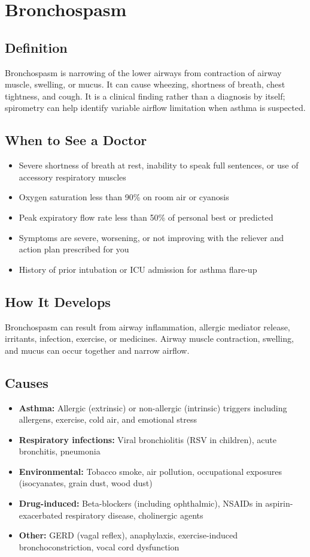 \chapter{Bronchospasm}

\section*{Definition}
Bronchospasm is narrowing of the lower airways from contraction of airway muscle, swelling, or mucus. It can cause wheezing, shortness of breath, chest tightness, and cough. It is a clinical finding rather than a diagnosis by itself; spirometry can help identify variable airflow limitation when asthma is suspected.

\section*{When to See a Doctor}

\begin{itemize}
 \item Severe shortness of breath at rest, inability to speak full sentences, or use of accessory respiratory muscles
 \item Oxygen saturation less than 90\% on room air or cyanosis
 \item Peak expiratory flow rate less than 50\% of personal best or predicted
 \item Symptoms are severe, worsening, or not improving with the reliever and action plan prescribed for you
 \item History of prior intubation or ICU admission for asthma flare-up
\end{itemize}

\section*{How It Develops}
Bronchospasm can result from airway inflammation, allergic mediator release, irritants, infection, exercise, or medicines. Airway muscle contraction, swelling, and mucus can occur together and narrow airflow.

\section*{Causes}
\begin{itemize}
 \item \textbf{Asthma:} Allergic (extrinsic) or non-allergic (intrinsic) triggers including allergens, exercise, cold air, and emotional stress
 \item \textbf{Respiratory infections:} Viral bronchiolitis (RSV in children), acute bronchitis, pneumonia
 \item \textbf{Environmental:} Tobacco smoke, air pollution, occupational exposures (isocyanates, grain dust, wood dust)
 \item \textbf{Drug-induced:} Beta-blockers (including ophthalmic), NSAIDs in aspirin-exacerbated respiratory disease, cholinergic agents
 \item \textbf{Other:} GERD (vagal reflex), anaphylaxis, exercise-induced bronchoconstriction, vocal cord dysfunction
\end{itemize}

